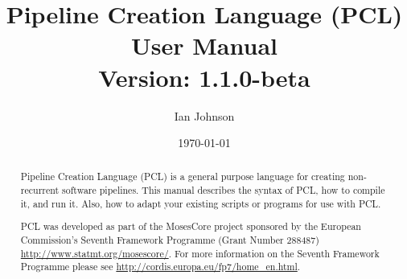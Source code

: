 \documentclass[11pt,a4paper,openright]{report}
\newcommand{\ReleaseVersion}{1.1.0-beta}
\begin{document}
\title{\huge{Pipeline Creation Language (PCL)}\\
\LARGE{User Manual}\\
\normalsize{Version: \ReleaseVersion}}
\author{Ian Johnson}
\date{\today}

\maketitle

\onehalfspacing

\begin{abstract}
Pipeline Creation Language (PCL) is a general purpose language for creating non-recurrent software pipelines. This manual describes the syntax of PCL, how to compile it, and run it. Also, how to adapt your existing scripts or programs for use with PCL.

PCL was developed as part of the MosesCore project sponsored by the European Commission's Seventh Framework Programme (Grant Number 288487) \url{http://www.statmt.org/mosescore/}. For more information on the Seventh Framework Programme please see \url{http://cordis.europa.eu/fp7/home_en.html}.
\end{abstract}


\tableofcontents
\listoffigures

\cleardoublepage
\setcounter{page}{1}






%
\end{document}
